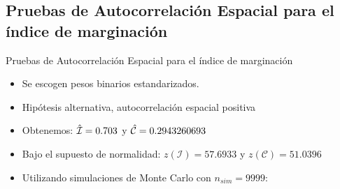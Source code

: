 \documentclass{beamer}
\begin{document}
\subsection{Pruebas de Autocorrelación Espacial para el índice de marginación}
\begin{frame}{Pruebas de Autocorrelación Espacial para el índice de marginación}
\begin{itemize}
\item Se escogen pesos binarios estandarizados.
\item Hipótesis alternativa, autocorrelación espacial positiva
\item Obtenemos: 
$\Hat{\mathcal{I}} = 0.703$ y $\Hat{\mathcal{C}} = 0.2943260693$
\item Bajo el supuesto de normalidad: $z(\mathcal{I}) = 57.6933$ y $z(\mathcal{C}) = 51.0396$
\item Utilizando simulaciones de Monte Carlo con $n_{sim}=9999$:


\end{itemize}
\end{frame}
\end{document}
